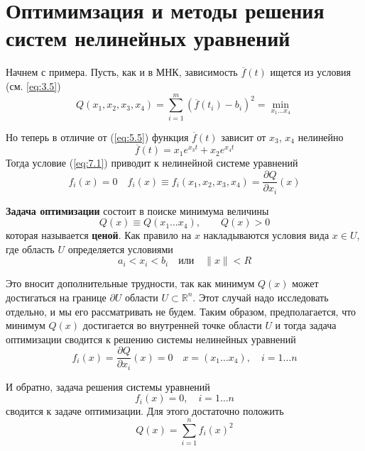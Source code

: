 \section{Оптимимзация и методы решения систем нелинейных уравнений}
\label{lecture:7}

Начнем с примера. Пусть, как и в МНК, зависимость $\overline{f}(t)$ ищется из условия (см. \ref{eq:3.5})
\begin{equation} \label{eq:7.1}
	Q(x_1, x_2, x_3, x_4) = \sum^m_{i=1}{(\overline{f}(t_i)-b_i)^2} = \min_{x_1 \dots x_4}
\end{equation}

Но теперь в отличие от (\ref{eq:5.5}) функция $\overline{f}(t)$ зависит от $x_3$, $x_4$ нелинейно
\begin{equation} \label{eq:7.2}
	\overline{f}(t) = x_1e^{x_3 t} + x_2e^{x_4 t}
\end{equation}
Тогда условие (\ref{eq:7.1}) приводит к нелинейной системе уравнений
\begin{equation} \label{eq:7.3}
	f_i(x) = 0 \quad
	f_i(x) \equiv f_i(x_1, x_2, x_3, x_4) = \frac{\partial Q}{\partial x_i}(x)
\end{equation}

\textbf{Задача оптимизации} состоит в поиске минимума величины 
\begin{equation} \label{eq:7.4}
	Q(x) \equiv Q(x_1 \dots x_4), \qquad
	Q(x) > 0
\end{equation}
которая называется \textbf{ценой}. Как правило на $x$ накладываются условия вида $x \in U$, где область $U$ определяется условиями
\begin{equation} \label{eq:7.5}
	a_i < x_i < b_i \quad \textrm{или} \quad \|x\| < R
\end{equation}

Это вносит дополнительные трудности, так как минимум $Q(x)$ может достигаться на границе $\partial U$  области $U \subset \mathbb{R}^n$. Этот случай надо исследовать отдельно, и мы его рассматривать не будем. Таким образом, предполагается, что минимум $Q(x)$ достигается во внутренней точке области $U$ и тогда задача оптимизации сводится к решению системы нелинейных уравнений
\begin{equation} \label{eq:7.6}
	f_i(x) = \frac{\partial Q}{\partial x_i}(x) = 0 \quad x = (x_1 \dots x_4), \quad i = 1 \dots n
\end{equation}

И обратно, задача решения системы уравнений
\begin{equation} \label{eq:7.7}
	f_i(x) = 0, \quad i = 1 \dots n
\end{equation}
сводится к задаче оптимизации. Для этого достаточно положить
\begin{equation} \label{eq:7.8}
	Q(x) = \sum^n_{i=1}{f_i(x)^2}
\end{equation}

